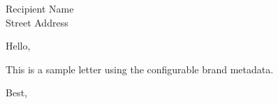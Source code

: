 \documentclass[11pt]{letter}
\begin{document}
\begin{letter}{Recipient Name\\Street Address}
\opening{Hello,}
This is a sample letter using the configurable brand metadata.
\closing{Best,}
\end{letter}
\end{document}

